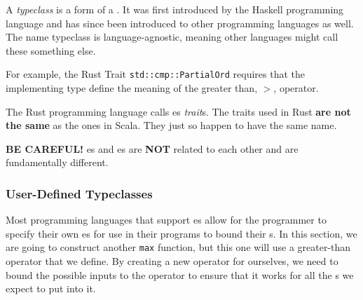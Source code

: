 \begin{definition}[Typeclass]\label{def:Typeclass}
  A \emph{typeclass} is a form of a .
  It was first introduced by the Haskell programming language and has since been introduced to other programming languages as well.
  The name typeclass is language-agnostic, meaning other languages might call these something else.

  For example, the Rust Trait \texttt{std::cmp::PartialOrd} requires that the implementing type define the meaning of the greater than, $>$, operator.
  
  \begin{remark}\label{rmk:Rust_Trait}
    The Rust programming language calls es \emph{trait}s.
    The traits used in Rust \textbf{are not the same} as the ones in Scala.
    They just so happen to have the same name.
  \end{remark}
  
  \begin{remark}
    \textbf{BE CAREFUL!}
    es and es are \textbf{NOT} related to each other and are fundamentally different.
  \end{remark}
\end{definition}

\subsubsection{User-Defined Typeclasses}\label{subsubsec:User_Defined_Typeclasses}
Most programming languages that support es allow for the programmer to specify their own es for use in their programs to bound their s.
In this section, we are going to construct another \texttt{max} function, but this one will use a greater-than operator that we define.
By creating a new operator for ourselves, we need to bound the possible inputs to the operator to ensure that it works for all the s we expect to put into it.

